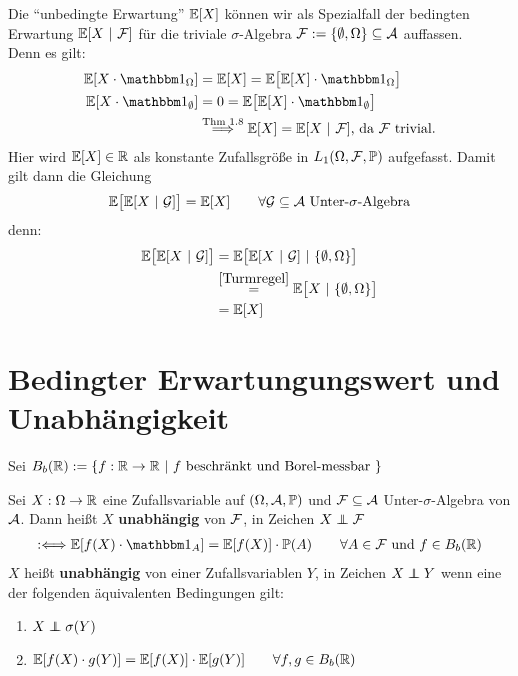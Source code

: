 \begin{bemerkung}
Die ``unbedingte Erwartung'' $\mathbb{E}[X]$ können wir als Spezialfall der bedingten Erwartung $\mathbb{E}[X~|~\mathcal{F}]$ für die triviale $\sigma$-Algebra $\mathcal{F}:=\lbrace\emptyset,\Omega\rbrace\subseteq\mathcal{A}$ auffassen.\\
Denn es gilt:
\begin{align*}
\E[X\cdot\indi_\Omega]&=\E[X]=\E\big[\E[X]\cdot\indi_\Omega\big]\\
\E[X\cdot\indi_\emptyset]&=0=\E\big[\E[X]\cdot\indi_\emptyset\big]\\
&\stackrel{\text{Thm 1.8}}{\Longrightarrow}
\E[X]=\E[X~|~\F]\text{, da $\F$ trivial.}
\end{align*}
Hier wird $\mathbb{E}[X]\in\mathbb{R}$ als konstante Zufallsgröße in $L_1(\Omega,\mathcal{F},\mathbb{P})$ aufgefasst. Damit gilt dann die Gleichung
\begin{align*}
\mathbb{E}\big[\mathbb{E}[X~|~\mathcal{G}]\big]=\mathbb{E}[X]\qquad\forall \mathcal{G}\subseteq\mathcal{A}\text{ Unter-$\sigma$-Algebra}
\end{align*}
denn:
\begin{align*}
\mathbb{E}\big[\mathbb{E}[X~|~\mathcal{G}]\big]
&=\mathbb{E}\big[\mathbb{E}[X~|~\mathcal{G}]~|~\lbrace\emptyset,\Omega\rbrace\big]\\
&\stackrel{\eqref{Turmregel}}{=}
\mathbb{E}\big[X~|~\lbrace\emptyset,\Omega\rbrace\big]\\
&=\mathbb{E}[X]
\end{align*}
\end{bemerkung}

\section*{Bedingter Erwartungungswert und Unabhängigkeit} %
Sei $B_b(\mathbb{R}):= \{f:\mathbb{R}\rightarrow\mathbb{R} ~|~f \text{ beschränkt und Borel-messbar }\}$
\begin{defi}
Sei $X:\Omega\to\mathbb{R}$ eine Zufallsvariable auf $(\Omega,\mathcal{A},\mathbb{P})$ und $\mathcal{F}\subseteq\mathcal{A}$ Unter-$\sigma$-Algebra von $\mathcal{A}$. Dann heißt $X$ \textbf{unabhängig} von $\mathcal{F}$, in Zeichen $X\unab\F$
\begin{align}\label{sigmaAlgebraUnabhaengig}
:\Longleftrightarrow
\E[f(X)\cdot\indi_A]
=
\E[f(X)]\cdot\P(A)\qquad\forall A\in\F\text{ und $f\in B_b(\R)$}
\end{align}
$X$ heißt \textbf{unabhängig} von einer Zufallsvariablen $Y$, in Zeichen $X\unab Y$ wenn eine der folgenden äquivalenten Bedingungen gilt:
\begin{enumerate}[label=(\alph*)]
\item $X\unab\sigma(Y)$
\item 
$\begin{aligned}
\mathbb{E}[f(X)\cdot g(Y)]
=
\mathbb{E}[f(X)]\cdot\mathbb{E}[g(Y)]\qquad\forall f,g\in B_b(\mathbb{R})
\end{aligned}$
\end{enumerate}
\end{defi}

